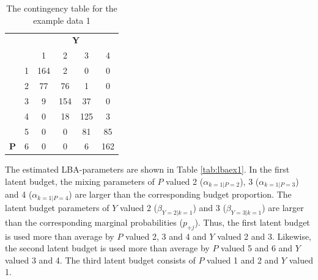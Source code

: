 \documentclass[]{interact}
\theoremstyle{plain}%
\theoremstyle{definition}
\theoremstyle{remark}
\begin{document}
\begin{table}[H]

\caption{\label{tab:tabex1}The contingency table for the example data 1}
\centering
\begin{tabular}[t]{>{}cccccc}
\toprule
\multicolumn{1}{c}{\textbf{ }} & \multicolumn{1}{c}{\textbf{ }} & \multicolumn{4}{c}{\textbf{Y}} \\
\cmidrule(l{3pt}r{3pt}){3-6}
 &  & 1 & 2 & 3 & 4\\
\midrule
 & 1 & 164 & 2 & 0 & 0\\

 & 2 & 77 & 76 & 1 & 0\\

 & 3 & 9 & 154 & 37 & 0\\

 & 4 & 0 & 18 & 125 & 3\\

 & 5 & 0 & 0 & 81 & 85\\

\multirow{-6}{*}{\centering\arraybackslash \textbf{P}} & 6 & 0 & 0 & 6 & 162\\
\bottomrule
\end{tabular}
\end{table}

The estimated LBA-parameters are shown in Table \ref{tab:lbaex1}. In the
first latent budget, the mixing parameters of \(P\) valued 2
(\(\alpha_{k=1|P=2}\)), 3 (\(\alpha_{k=1|P=3}\)) and 4
(\(\alpha_{k=1|P=4}\)) are larger than the corresponding budget
proportion. The latent budget parameters of \(Y\) valued 2
(\(\beta_{Y=2|k=1}\)) and 3 (\(\beta_{Y=3|k=1}\)) are larger than the
corresponding marginal probabilities (\(p_{+j}\)). Thus, the first
latent budget is used more than average by \(P\) valued 2, 3 and 4 and
\(Y\) valued 2 and 3. Likewise, the second latent budget is used more
than average by \(P\) valued 5 and 6 and \(Y\) valued 3 and 4. The third
latent budget consists of \(P\) valued 1 and 2 and \(Y\) valued 1.
\end{document}
